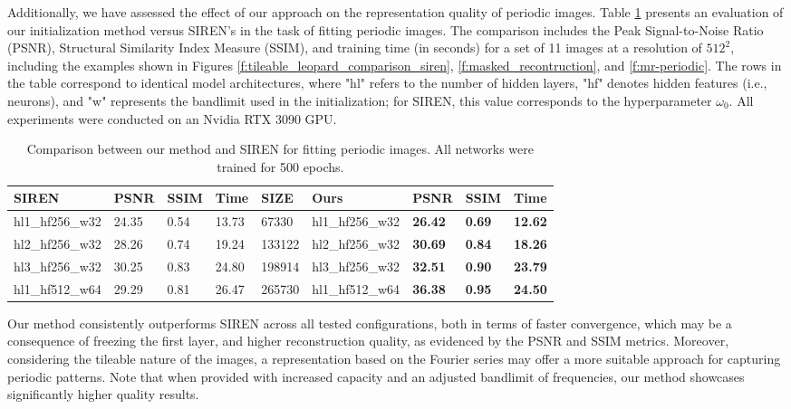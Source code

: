 Additionally, we have assessed the effect of our approach on the representation quality of periodic images. Table \ref{t:comparison-siren} presents an evaluation of our initialization method versus SIREN's in the task of fitting periodic images. The comparison includes the Peak Signal-to-Noise Ratio (PSNR), Structural Similarity Index Measure (SSIM), and training time (in seconds) for a set of 11 images at a resolution of \(512^2\), including the examples shown in Figures \ref{f:tileable_leopard_comparison_siren}, \ref{f:masked_recontruction}, and \ref{f:mr-periodic}. The rows in the table correspond to identical model architectures, where "hl" refers to the number of hidden layers, "hf" denotes hidden features (i.e., neurons), and "w" represents the bandlimit used in the initialization; for SIREN, this value corresponds to the hyperparameter \(\omega_0\). All experiments were conducted on an Nvidia RTX 3090 GPU.

\begin{table}[h]
\footnotesize
\begin{tabular}{llll|l|llll}
\hline
\textbf{SIREN}            & \textbf{PSNR}  & \textbf{SSIM} & \textbf{Time} & \textbf{SIZE} & \textbf{Ours}        & \textbf{PSNR}  & \textbf{SSIM} & \textbf{Time} \\
\hline
hl1\_hf256\_w32 & 24.35          & 0.54          & 13.73          & 67330       & hl1\_hf256\_w32 & \textbf{26.42} & \textbf{0.69} & \textbf{12.62} \\
hl2\_hf256\_w32 & 28.26          & 0.74          & 19.24          & 133122      & hl2\_hf256\_w32 & \textbf{30.69} & \textbf{0.84} & \textbf{18.26} \\
hl3\_hf256\_w32 & 30.25          & 0.83          & 24.80          & 198914      & hl3\_hf256\_w32 & \textbf{32.51} & \textbf{0.90} & \textbf{23.79} \\
\hline
hl1\_hf512\_w64 & 29.29 & 0.81 & 26.47          & 265730      & hl1\_hf512\_w64 & \textbf{36.38} & \textbf{0.95} & \textbf{24.50}\\ 
\hline
\end{tabular}
\caption{Comparison between our method and SIREN for fitting periodic images. All networks were trained for 500 epochs.}
\label{t:comparison-siren}
\end{table}

Our method consistently outperforms SIREN across all tested configurations, both in terms of faster convergence, which may be a consequence of freezing the first layer, and higher reconstruction quality, as evidenced by the PSNR and SSIM metrics. Moreover, considering the tileable nature of the images, a representation based on the Fourier series may offer a more suitable approach for capturing periodic patterns. Note that when provided with increased capacity and an adjusted bandlimit of frequencies, our method showcases significantly higher quality results.

